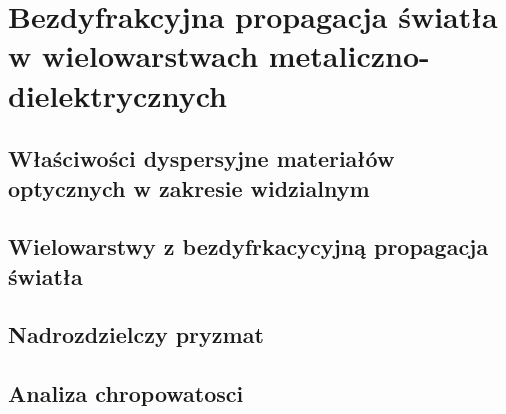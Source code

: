 \chapter{Bezdyfrakcyjna propagacja światła w wielowarstwach metaliczno-dielektrycznych}

\section{Właściwości dyspersyjne materiałów optycznych w zakresie widzialnym}

\section{Wielowarstwy z bezdyfrkacycyjną propagacja światła}

\section{Nadrozdzielczy pryzmat}


\section{Analiza chropowatosci}



